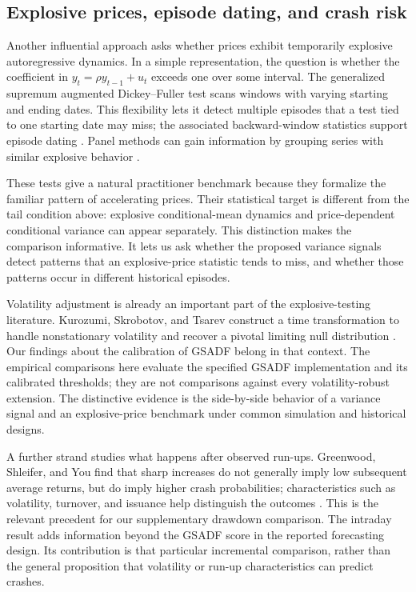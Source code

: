 \subsection{Explosive prices, episode dating, and crash risk}
Another influential approach asks whether prices exhibit temporarily
explosive autoregressive dynamics. In a simple representation, the question
is whether the coefficient in $y_t=\rho y_{t-1}+u_t$ exceeds one over some
interval. The generalized supremum augmented Dickey--Fuller test scans
windows with varying starting and ending dates. This flexibility lets it
detect multiple episodes that a test tied to one starting date may miss;
the associated backward-window statistics support episode dating
\cite{phillips2012multiple,phillips2013realtime}. Panel methods can gain
information by grouping series with similar explosive behavior
\cite{liu2022panel}.

These tests give a natural practitioner benchmark because they formalize
the familiar pattern of accelerating prices. Their statistical target is
different from the tail condition above: explosive conditional-mean
dynamics and price-dependent conditional variance can appear separately.
This distinction makes the comparison informative. It lets us ask whether
the proposed variance signals detect patterns that an explosive-price
statistic tends to miss, and whether those patterns occur in different
historical episodes.

Volatility adjustment is already an important part of the explosive-testing
literature. Kurozumi, Skrobotov, and Tsarev construct a time transformation
to handle nonstationary volatility and recover a pivotal limiting null
distribution \cite{kurozumi2021time}. Our findings about the calibration
of GSADF belong in that context. The empirical comparisons here evaluate
the specified GSADF implementation and its calibrated thresholds; they
are not comparisons against every volatility-robust extension. The
distinctive evidence is the side-by-side behavior of a variance signal
and an explosive-price benchmark under common simulation and historical
designs.

A further strand studies what happens after observed run-ups. Greenwood,
Shleifer, and You find that sharp increases do not generally imply low
subsequent average returns, but do imply higher crash probabilities;
characteristics such as volatility, turnover, and issuance help distinguish
the outcomes \cite{greenwood2017bubbles}. This is the relevant precedent
for our supplementary drawdown comparison. The intraday result adds
information beyond the GSADF score in the reported forecasting design.
Its contribution is that particular incremental comparison, rather than
the general proposition that volatility or run-up characteristics can
predict crashes.

